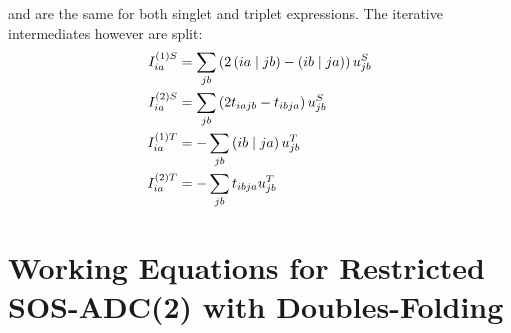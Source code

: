 \noindent and are the same for both singlet and triplet expressions. The iterative intermediates however are split:
\begin{align}
I^{(1)S}_{ia} &= \sum_{jb} \left( 2\left( ia \mid jb \right) - \left( ib \mid ja \right) \right) u_{jb}^S
\\
I^{(2)S}_{ia} &= \sum_{jb} \left( 2t_{iajb} - t_{ibja}\right) u_{jb}^S
\\
I^{(1)T}_{ia} &= - \sum_{jb} \left( ib \mid ja \right) u_{jb}^T
\\
I^{(2)T}_{ia} &= - \sum_{jb} t_{ibja} u_{jb}^T
\end{align}

\section{Working Equations for Restricted SOS-ADC(2) with Doubles-Folding}

